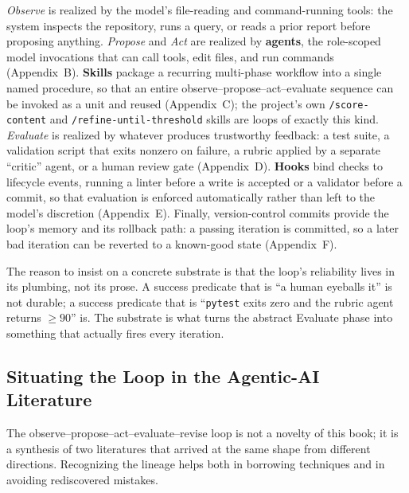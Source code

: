 \emph{Observe} is realized by the model's file-reading and command-running tools: the system inspects the repository, runs a query, or reads a prior report before proposing anything. \emph{Propose} and \emph{Act} are realized by \textbf{agents}, the role-scoped model invocations that can call tools, edit files, and run commands (Appendix~B). \textbf{Skills} package a recurring multi-phase workflow into a single named procedure, so that an entire observe--propose--act--evaluate sequence can be invoked as a unit and reused (Appendix~C); the project's own \texttt{/score-content} and \texttt{/refine-until-threshold} skills are loops of exactly this kind. \emph{Evaluate} is realized by whatever produces trustworthy feedback: a test suite, a validation script that exits nonzero on failure, a rubric applied by a separate ``critic'' agent, or a human review gate (Appendix~D). \textbf{Hooks} bind checks to lifecycle events, running a linter before a write is accepted or a validator before a commit, so that evaluation is enforced automatically rather than left to the model's discretion (Appendix~E). Finally, version-control commits provide the loop's memory and its rollback path: a passing iteration is committed, so a later bad iteration can be reverted to a known-good state (Appendix~F).

\begin{remark}
The reason to insist on a concrete substrate is that the loop's reliability lives in its plumbing, not its prose. A success predicate that is ``a human eyeballs it'' is not durable; a success predicate that is ``\texttt{pytest} exits zero and the rubric agent returns $\geq 90$'' is. The substrate is what turns the abstract Evaluate phase into something that actually fires every iteration.
\end{remark}

\subsection{Situating the Loop in the Agentic-AI Literature}\label{subsec:agentic-literature}

The observe--propose--act--evaluate--revise loop is not a novelty of this book; it is a synthesis of two literatures that arrived at the same shape from different directions. Recognizing the lineage helps both in borrowing techniques and in avoiding rediscovered mistakes.

